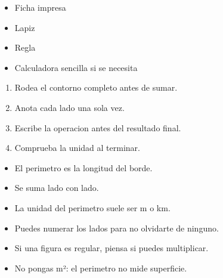 \documentclass[12pt,a4paper]{article}
\begin{document}
        \FichaCabecera

        \begin{materialesbox}
        \begin{itemize}
    \item Ficha impresa
    \item Lapiz
    \item Regla
    \item Calculadora sencilla si se necesita
\end{itemize}
        \end{materialesbox}

        \begin{pasosbox}
        \begin{enumerate}
    \item Rodea el contorno completo antes de sumar.
    \item Anota cada lado una sola vez.
    \item Escribe la operacion antes del resultado final.
    \item Comprueba la unidad al terminar.
\end{enumerate}
        \end{pasosbox}

        \begin{recordatoriobox}
        \begin{itemize}
    \item El perimetro es la longitud del borde.
    \item Se suma lado con lado.
    \item La unidad del perimetro suele ser m o km.
\end{itemize}
        \end{recordatoriobox}

        \begin{apoyobox}
        \begin{itemize}
    \item Puedes numerar los lados para no olvidarte de ninguno.
    \item Si una figura es regular, piensa si puedes multiplicar.
    \item No pongas m²: el perimetro no mide superficie.
\end{itemize}
        \end{apoyobox}


\end{document}
